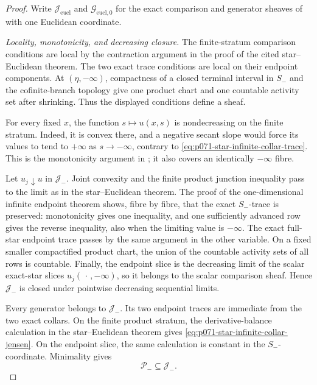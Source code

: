 \begin{proof}
Write $\mathcal J_{\mathrm{eucl}}$ and
$\mathcal G_{\mathrm{eucl},0}$ for the exact comparison and generator
sheaves of
 with one Euclidean
coordinate.

\medskip\noindent
\emph{Locality, monotonicity, and decreasing closure.}
The finite-stratum comparison conditions are local by the contraction
argument in the proof of the cited star--Euclidean theorem.  The two exact
trace conditions are local on their endpoint components.  At
$(\eta,-\infty)$, compactness of a closed terminal interval in $S_-$ and
the cofinite-branch topology give one product chart and one countable
activity set after shrinking.  Thus the displayed conditions define a
sheaf.

For every fixed $x$, the function $s\mapsto u(x,s)$ is nondecreasing on
the finite stratum.  Indeed, it is convex there, and a negative secant
slope would force its values to tend to $+\infty$ as $s\to-\infty$,
contrary to \eqref{eq:p071-star-infinite-collar-trace}.  This is the
monotonicity argument in
; it also covers an
identically $-\infty$ fibre.

Let $u_j\downarrow u$ in $\mathcal J_-$.  Joint convexity and the finite
product junction inequality pass to the limit as in the
star--Euclidean theorem.  The proof of the one-dimensional infinite
endpoint theorem shows, fibre by fibre, that the exact $S_-$-trace is
preserved: monotonicity gives one inequality, and one sufficiently
advanced row gives the reverse inequality, also when the limiting value
is $-\infty$.  The exact full-star endpoint trace passes by the same
argument in the other variable.  On a fixed smaller compactified product
chart, the union of the countable activity sets of all rows is countable.
Finally, the endpoint slice is the decreasing limit of the scalar
exact-star slices $u_j(\,\cdot\,,-\infty)$, so it belongs to the scalar
comparison sheaf.  Hence $\mathcal J_-$ is closed under pointwise
decreasing sequential limits.

Every generator belongs to $\mathcal J_-$.  Its two endpoint traces are
immediate from the two exact collars.  On the finite product stratum, the
derivative-balance calculation in the star--Euclidean theorem gives
\eqref{eq:p071-star-infinite-collar-jensen}.  On the endpoint slice, the
same calculation is constant in the $S_-$-coordinate.  Minimality gives
\begin{equation}
                         \mathcal P_-\subseteq\mathcal J_-.
\label{eq:p071-star-infinite-collar-minimality}
\end{equation}


\end{proof}
